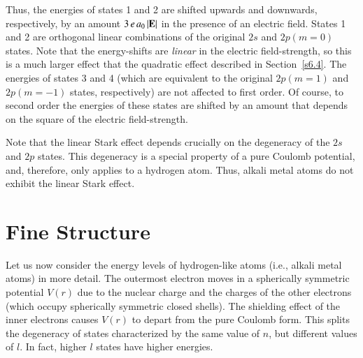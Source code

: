 Thus, the energies of states 1 and 2 are shifted upwards and downwards, respectively, 
by an amount $3\,e\,a_0\, |{\bf E}|$  in the presence of an electric field.
States 1 and 2 are orthogonal linear combinations of the original
$2s$ and $2p(m=0)$ states. 
 Note that
the energy-shifts are {\em linear}\/ in the electric field-strength, so this
is a much larger effect that the quadratic  effect described in Section~\ref{s6.4}.
The energies of states 3 and 4 (which are equivalent to the
original  $2p(m=1)$  and $2p(m=-1)$ states, respectively) 
are not affected to first order. Of course, to second order the energies of these states are shifted by an amount that depends on the
square of the electric field-strength. 

Note that the linear Stark effect depends crucially on the degeneracy of
the $2s$ and
$2p$ states. This degeneracy is a special property of
a pure Coulomb potential, and, therefore, only applies to a hydrogen atom.
Thus, alkali metal atoms do not exhibit the linear Stark effect. 
 
\section{Fine Structure} \label{s7.7x}
Let us now consider the energy levels of hydrogen-like atoms ({\rm i.e.}, alkali
metal atoms) in more detail. The outermost electron moves in a spherically
symmetric potential $V(r)$ due to the nuclear charge and the charges of the
other electrons (which occupy spherically symmetric closed shells). The
shielding effect of the inner electrons causes $V(r)$ to depart from
the pure Coulomb form. This splits the degeneracy of states characterized by the
same value of $n$, but different values of $l$. In fact, higher $l$ states 
have higher energies. 

